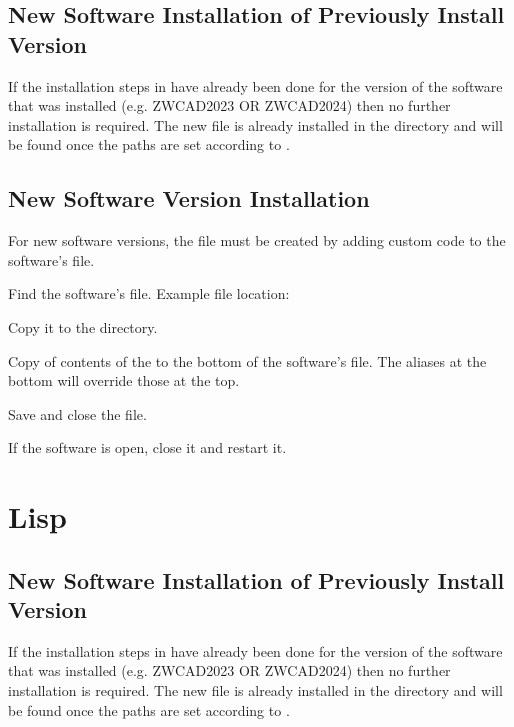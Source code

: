 \subsection{New Software Installation of Previously Install Version}
If the installation steps in \sectionname{\ref{sec:pgpinstallation}} have already been done for the version of the software that was installed (e.g. ZWCAD2023 OR ZWCAD2024) then no further installation is required.  The new  file is already installed in the \supportdir{} directory and will be found once the paths are set according to \sectionname{\ref{sec:paths}}.

\subsection{New Software Version Installation}
\label{sec:pgpinstallation}
For new software versions, the  file must be created by adding custom code to the software's  file.
\begin{numberedlist}
    \item Find the software's  file.  Example file location:
    \begin{plainlist}
    	\item {}
    \end{plainlist}
    \item Copy it to the \supportdir{} directory.
    \item Copy of contents of the \userdir\tbs{} to the bottom of the software's  file.  The aliases at the bottom will override those at the top.
    \item Save and close the file.
    \item If the software is open, close it and restart it.
\end{numberedlist}

\section{Lisp}
\subsection{New Software Installation of Previously Install Version}
If the installation steps in \sectionname{\ref{sec:lispinstallation}} have already been done for the version of the software that was installed (e.g. ZWCAD2023 OR ZWCAD2024) then no further installation is required.  The new  file is already installed in the \supportdir{} directory and will be found once the paths are set according to \sectionname{\ref{sec:paths}}.

